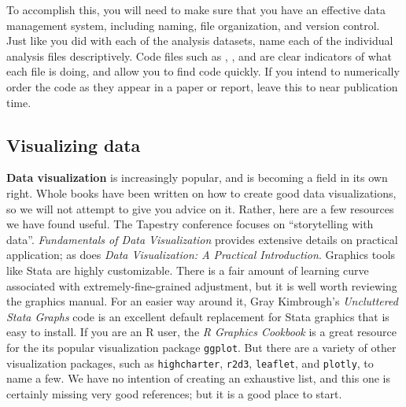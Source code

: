 To accomplish this, you will need to make sure that you have an effective data management system,
including naming, file organization, and version control.
Just like you did with each of the analysis datasets,
name each of the individual analysis files descriptively.
Code files such as ,
, and 
are clear indicators of what each file is doing, and allow you to find code quickly.
If you intend to numerically order the code as they appear in a paper or report,
leave this to near publication time.

\subsection{Visualizing data}

\textbf{Data visualization} 
is increasingly popular, and is becoming a field in its own right.\cite{healy2018data,wilke2019fundamentals}
Whole books have been written on how to create good data visualizations,
so we will not attempt to give you advice on it.
Rather, here are a few resources we have found useful.
The Tapestry conference focuses on ``storytelling with data''.
\textit{Fundamentals of Data Visualization} provides extensive details on practical application;
as does \textit{Data Visualization: A Practical Introduction}.
Graphics tools like Stata are highly customizable.
There is a fair amount of learning curve associated with extremely-fine-grained adjustment,
but it is well worth reviewing the graphics manual.
For an easier way around it, Gray Kimbrough's \textit{Uncluttered Stata Graphs}
code is an excellent default replacement for Stata graphics that is easy to install.
If you are an R user, the \textit{R Graphics Cookbook}
is a great resource for the its popular visualization package \texttt{ggplot}.
But there are a variety of other visualization packages,
such as \texttt{highcharter},
\texttt{r2d3},
\texttt{leaflet},
and \texttt{plotly}, to name a few.
We have no intention of creating an exhaustive list, and this one is certainly missing very good references; but it is a good place to start.

